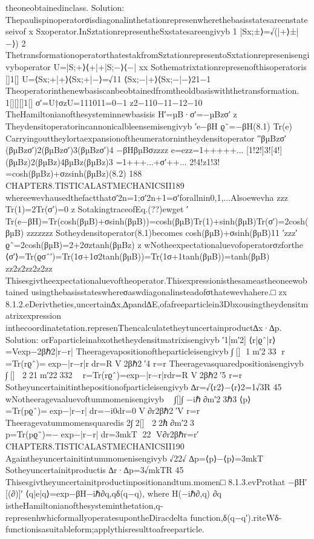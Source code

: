 {{{{{{{{{{theoneobtainedinclass.
Solution:
Thepaulispinoperatorσisdiagonalinthetationrepresenwherethebasisstatesareenstateseivof
x
Sxoperator.InSztationrepresentheSxstatesareengivyb
1
|Sx;±⟩=√(|+⟩±|−⟩)
2
ThetransformationoperatorthatestakfromSztationrepresentoSxtationrepresenisengivyboperator
U=|S;+⟩⟨+|+|S;−⟩⟨−|
xx
Sothematrixtationrepresenofthisoperatoris
[]1[]
U=⟨Sx;+|+⟩⟨Sx;+|−⟩=√11
⟨Sx;−|+⟩⟨Sx;−|−⟩21−1
Theoperatorinthenewbasiscanbeobtainedfromtheoldbasiswiththetransformation.
1[][][]1[]
σ′=U†σzU=111011=0−1
z2−110−11−12−10
TheHamiltonianofthesysteminnewbasisis
H′=µB·σ′=−µBzσ′
z
Theydensitoperatorincannonicalbleensemisengivyb
′e−βH
ϱˆ=−βH(8.1)
Tr(e)
Carryingouttheylortaexpansionoftheumeratornintheydensitoperator
′′βµBzσ′(βµBzσ′)2(βµBzσ′)3(βµBzσ′)4
−βHβµBσzzzz
e=ezz=1+++++...
[1!2!]3![4!]
(βµBz)2(βµBz)4βµBz(βµBz)3
=1+++...+σ′++...
2!4!z1!3!
=cosh(βµBz)+σzsinh(βµBz)(8.2)
188
CHAPTER8.TISTICALASTMECHANICSII189
whereewevhausedthefactthatσ′2n=1;σ′2n+1=σ′forallnin{0,1,...}Alsoewevha
zzz
Tr(1)=2Tr(σ′)=0
z
SotakingtraceofEq.(??)ewget
′
Tr(e−βH)=Tr(cosh(βµB)+σsinh(βµB))=cosh(βµB)Tr(1)+sinh(βµB)Tr(σ′)=2cosh(βµB)
zzzzzzz
Sotheydensitoperator(8.1)becomes
cosh(βµB)+σsinh(βµB)11
′zzz′
ϱˆ=2cosh(βµB)=2+2σztanh(βµBz)
z
wNotheexpectationaluevofoperatorσzforthe
⟨σ′⟩=Tr(ϱσˆ′)=Tr(1σ+1σ2tanh(βµB))=Tr(1σ+1tanh(βµB))=tanh(βµB)
zz2z2zz2z2zz
Thisesgivtheexpectationaluevoftheoperator.Thisexpressionisthesameastheoneewobtained
usingthebasisstateswhereσaswdiagonalinsteadofσthatewevhahere.□
zx
8.1.2.eDerivtheties,uncertain∆x,∆pand∆E,ofafreeparticlein3Dbxousingtheydensitmatrixexpression
inthecoordinatetation.represenThencalculatetheytuncertainproduct∆x·∆p.
Solution:
orFaparticleinabxothetheydensitmatrixisengivyb
′1[m′2]
⟨r|ϱˆ|r⟩=Vexp−2βℏ2|r−r|
Theeragevapositionoftheparticleisengivyb
∫[]
1m′233
⟨r⟩=Tr(rϱˆ)=exp−|r−r|rdr=R
V2βℏ2′4
r=r
Theeragevasquaredpositionisengivyb
∫[]
⟨2⟩21m′22332

r=Tr(rϱˆ)=exp−|r−r|rdr=R
V2βℏ2′5
r=r
Sotheyuncertainitinthepositionofparticleisengivyb
∆r=√⟨r2⟩−⟨r⟩2=1√3R
45
wNotheeragevaaluevoftummomenisengivyb

∫[]∫
−iℏ∂m′23ℏ3
⟨p⟩=Tr(pϱˆ)=exp−|r−r|dr=−i0dr=0
V∂r2βℏ2′V
r=r
Theeragevatummomensquaredis
2∫2[]
⟨2⟩2ℏ∂m′23
p=Tr(pϱˆ)=−exp−|r−r|dr=3mkT
22
V∂r2βℏr=r′
CHAPTER8.TISTICALASTMECHANICSII190
Againtheyuncertainitintummomenisengivyb
√22√
∆p=⟨p⟩−⟨p⟩=3mkT
Sotheyuncertainitproductis
∆r·∆p=3√mkTR
45
Thisesgivtheyuncertainitproductinpositionandtum.momen□
8.1.3.evProthat
−βH′[(∂)]′
⟨q|e|q⟩=exp−βH−iℏ∂q,qδ(q−q),
where
H(−iℏ∂,q)
∂q
istheHamiltonianofthesysteminthetation,q-represenhwhicformallyoperatesupontheDiracdelta
function,δ(q−q′).riteWδ-functionisasuitableform;applythisresulttoafreeparticle.
}}}}}}}}}}
